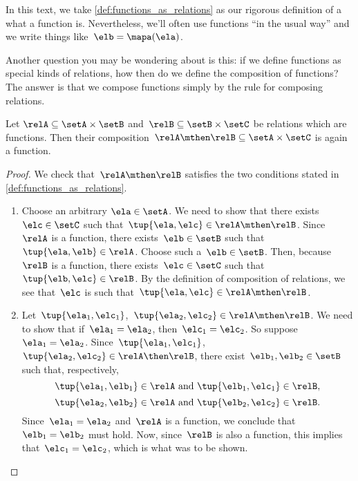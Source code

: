 In this text, we take \cref{def:functions_as_relations} as our rigorous definition of a what a function is. Nevertheless, we'll often use functions ``in the usual way'' and we write things like~$\elb = \mapa(\ela)$.

Another question you may be wondering about is this: if we define functions as special kinds of relations, how then do we define the composition of functions? The answer is that we compose functions simply by the rule for composing relations.

\begin{lemma}
  \label{lem:comprelfun}
  Let $\relA \subseteq \setA \times \setB$ and~$\relB \subseteq \setB \times \setC$ be relations which are functions. Then their composition~$\relA \mthen \relB \subseteq \setA \times \setC$ is again a function.
\end{lemma}

\begin{proof}
  We check that~$\relA \mthen \relB$ satisfies the two conditions stated in \cref{def:functions_as_relations}.

  \begin{enumerate}
    \item Choose an arbitrary $\ela \in \setA$. We need to show that there exists~$\elc \in \setC$ such that~$\tup{\ela,\elc} \in \relA \mthen \relB$. Since~$\relA$ is a function, there exists~$\elb \in \setB$ such that~$\tup{\ela,\elb} \in \relA$. Choose such a~$\elb \in \setB$. Then, because~$\relB$ is a function, there exists~$\elc \in \setC$ such that~$\tup{\elb,\elc} \in \relB$. By the definition of composition of relations, we see that~$\elc$ is such that~$\tup{\ela,\elc} \in \relA \mthen \relB$.
    \item Let~$\tup{\ela_1, \elc_1}$,~$\tup{\ela_2,\elc_2} \in \relA \mthen \relB$. We need to show that if~$\ela_1 = \ela_2$, then~$\elc_1 = \elc_2$. So suppose~$\ela_1 = \ela_2$. Since~$\tup{\ela_1, \elc_1}$,~$\tup{\ela_2,\elc_2} \in \relA \then \relB$, there exist~$\elb_1, \elb_2 \in \setB$ such that, respectively,
    \begin{equation*}
      \tup{\ela_1, \elb_1} \in \relA \text{ and } \tup{\elb_1, \elc_1} \in \relB,
    \end{equation*}
    \begin{equation*}
      \tup{\ela_2, \elb_2} \in \relA \text{ and } \tup{\elb_2, \elc_2} \in \relB.
    \end{equation*}
    Since~$\ela_1 = \ela_2$ and~$\relA$ is a function, we conclude that~$\elb_1 = \elb_2$ must hold. Now, since~$\relB$ is also a function, this implies that~$\elc_1 = \elc_2$, which is what was to be shown.
  \end{enumerate}
\end{proof}

